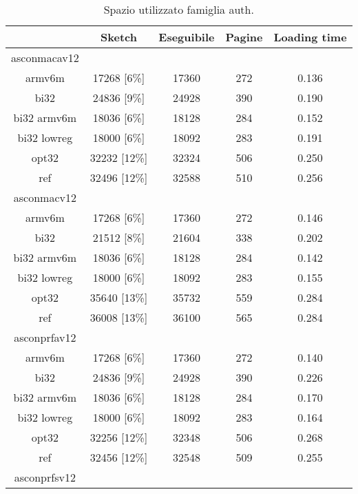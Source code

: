 \begin{table}[h]
    \caption{Spazio utilizzato famiglia auth.}
    \centering
	\begin{tabular}{|c|c|c|c|c|}
		\hline
         & Sketch & Eseguibile & Pagine & Loading time \\
        \hline
        asconmacav12 & & & & \\
        \hline
        armv6m & 17268 [6\%] & 17360 & 272 & 0.136 \\
        \hline
        bi32 & 24836 [9\%] & 24928 & 390 & 0.190 \\
        \hline
        bi32 armv6m & 18036 [6\%] & 18128 & 284 & 0.152 \\
        \hline
        bi32 lowreg & 18000 [6\%] & 18092 & 283 & 0.191 \\
        \hline
        opt32 & 32232 [12\%] & 32324 & 506 & 0.250 \\
        \hline
        ref & 32496 [12\%] & 32588 & 510 & 0.256 \\
        \hline
        asconmacv12 & & & & \\
        \hline
        armv6m & 17268 [6\%] & 17360 & 272 & 0.146 \\
        \hline
        bi32 & 21512 [8\%] & 21604 & 338 & 0.202 \\
        \hline
        bi32 armv6m & 18036 [6\%] & 18128 & 284 & 0.142 \\
        \hline
        bi32 lowreg & 18000 [6\%] & 18092 & 283 & 0.155 \\
        \hline
        opt32 & 35640 [13\%] & 35732 & 559 & 0.284 \\
        \hline
        ref & 36008 [13\%] & 36100 & 565 & 0.284 \\
        \hline
        asconprfav12 & & & & \\
        \hline
        armv6m & 17268 [6\%] & 17360 & 272 & 0.140 \\
        \hline
        bi32 & 24836 [9\%] & 24928 & 390 & 0.226 \\
        \hline
        bi32 armv6m & 18036 [6\%] & 18128 & 284 & 0.170 \\
        \hline
        bi32 lowreg & 18000 [6\%] & 18092 & 283 & 0.164 \\
        \hline
        opt32 & 32256 [12\%] & 32348 & 506 & 0.268 \\
        \hline
        ref & 32456 [12\%] & 32548 & 509 & 0.255 \\
        \hline
        asconprfsv12 & & & & \\

\end{tabular}
\end{table}
